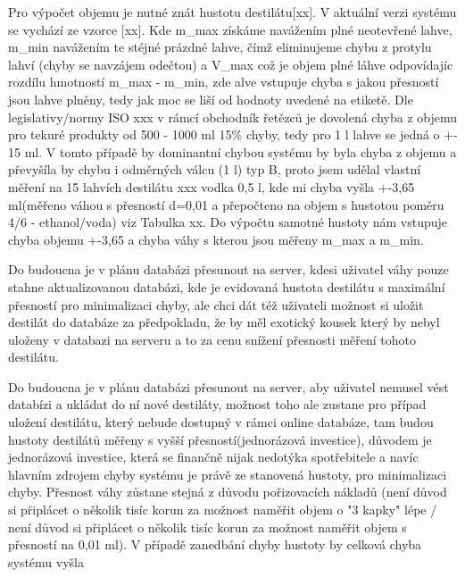 Pro výpočet objemu je nutné znát hustotu destilátu[xx]. V aktuální verzi systému se vychází ze vzorce [xx]. Kde m\_max získáme navážením plné neotevřené lahve, m\_min navážením te stéjné prázdné lahve, čímž eliminujeme chybu z protylu lahví (chyby se navzájem odečtou) a V\_max což je objem plné láhve odpovídajíc rozdílu hmotností m\_max - m\_min, zde alve vstupuje chyba s jakou přesností jsou lahve plněny, tedy jak moc se liší od hodnoty uvedené na etiketě. Dle legislativy/normy ISO xxx v rámcí obchodník řetězců je dovolená chyba z objemu pro tekuré produkty od 500 - 1000 ml 15\% chyby, tedy pro 1 l lahve se jedná o +- 15 ml. V tomto případě by dominantní chybou systému by byla chyba z objemu a převyšíla by chybu i odměrných válcu (1 l) typ B, proto jsem udělal vlastní měření na 15 lahvích destilátu xxx vodka 0,5 l, kde mi chyba vyšla +-3,65 ml(měřeno váhou s přesností d=0,01 a přepočteno na objem s hustotou poměru 4/6 - ethanol/voda) viz Tabulka xx. Do výpočtu samotné hustoty nám vstupuje chyba  objemu +-3,65 a chyba váhy s kterou jsou měřeny m\_max a m\_min.

Do budoucna je v plánu databázi přesunout na server, kdesi uživatel váhy pouze stahne aktualizovanou databázi, kde je evidovaná hustota destilátu s maximální přesností pro minimalizaci chyby, ale chci dát též uživateli možnost si uložit destilát do databáze za předpokladu, že by měl exotický kousek který by nebyl uloženy v databazi na serveru a to za cenu snížení přesnosti měření tohoto destilátu. 

Do budoucna je v plánu databázi přesunout na server, aby uživatel nemusel vést databízi a ukládat do ní nové destiláty, možnost toho ale zustane pro případ uložení destilátu, který nebude dostupný v rámci online databáze, tam budou hustoty destilátů měřeny s vyšší přesností(jednorázová investice), důvodem je jednorázová investice, která se finančně nijak nedotýka spotřebitele a navíc hlavním zdrojem chyby systému je právě ze stanovená hustoty, pro minimalizaci chyby. Přesnost váhy zůstane stejná z důvodu pořizovacích nákladů (není důvod si připlácet o několik tisíc korun za možnost naměřit objem o "3 kapky" lépe / není důvod si připlácet o několik tisíc korun za možnost naměřit objem s přesností na 0,01 ml). V případě zanedbání chyby hustoty by celková chyba systému vyšla 




